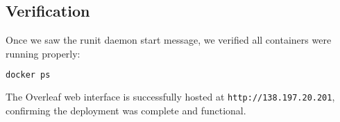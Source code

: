 \subsection{Verification}

Once we saw the runit daemon start message, we verified all containers were running properly:

\begin{lstlisting}[language=bash]
docker ps
\end{lstlisting}

The Overleaf web interface is successfully hosted at \texttt{http://138.197.20.201}, confirming the deployment was complete and functional.